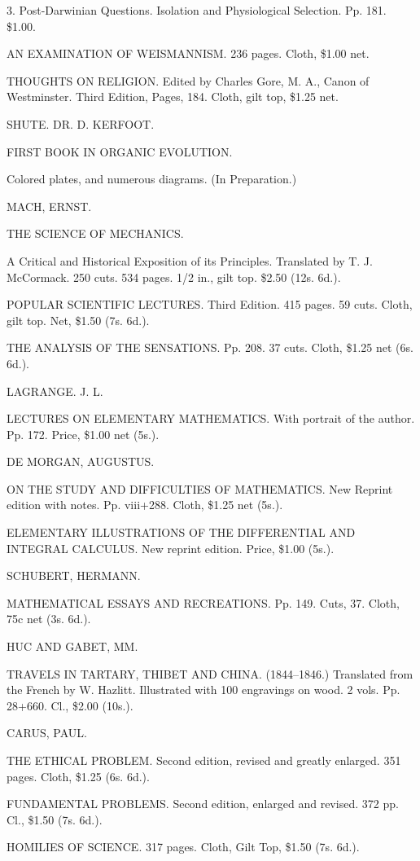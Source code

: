 \documentclass[12pt]{book}[2005/09/16]
\renewcommand{\(}{{\upshape(}}
\renewcommand{\)}{{\upshape)}}
\begin{document}
3. Post-Darwinian Questions. Isolation and Physiological Selection.
Pp. 181. \$1.00.

AN EXAMINATION OF WEISMANNISM.
236 pages. Cloth, \$1.00 net.

THOUGHTS ON RELIGION.
Edited by Charles Gore, M. A., Canon of Westminster. Third Edition,
Pages, 184. Cloth, gilt top, \$1.25 net.


SHUTE. DR. D. KERFOOT.

FIRST BOOK IN ORGANIC EVOLUTION.

Colored plates, and numerous diagrams. (In Preparation.)


MACH, ERNST.

THE SCIENCE OF MECHANICS.

A Critical and Historical Exposition of its Principles. Translated
by T. J. McCormack. 250 cuts. 534 pages. 1/2 in., gilt top. \$2.50 (12s. 6d.).

POPULAR SCIENTIFIC LECTURES.
Third Edition. 415 pages. 59 cuts. Cloth, gilt top. Net, \$1.50 (7s. 6d.).

THE ANALYSIS OF THE SENSATIONS.
Pp. 208. 37 cuts. Cloth, \$1.25 net (6s. 6d.).


LAGRANGE. J. L.

LECTURES ON ELEMENTARY MATHEMATICS.
With portrait of the author. Pp. 172. Price, \$1.00 net (5s.).


DE MORGAN, AUGUSTUS.

ON THE STUDY AND DIFFICULTIES OF MATHEMATICS.
New Reprint edition with notes. Pp. viii+288. Cloth, \$1.25 net (5s.).

ELEMENTARY ILLUSTRATIONS OF THE DIFFERENTIAL AND
INTEGRAL CALCULUS.
New reprint edition. Price, \$1.00 (5s.).


SCHUBERT, HERMANN.

MATHEMATICAL ESSAYS AND RECREATIONS.
Pp. 149. Cuts, 37. Cloth, 75c net (3s. 6d.).


HUC AND GABET, MM.

TRAVELS IN TARTARY, THIBET AND CHINA.
(1844--1846.) Translated from the French by W. Hazlitt. Illustrated
with 100 engravings on wood. 2 vols. Pp. 28+660. Cl., \$2.00 (10s.).

CARUS, PAUL.

THE ETHICAL PROBLEM.
Second edition, revised and greatly enlarged. 351 pages. Cloth, \$1.25
(6s. 6d.).

FUNDAMENTAL PROBLEMS.
Second edition, enlarged and revised. 372 pp. Cl., \$1.50 (7s. 6d.).

HOMILIES OF SCIENCE.
317 pages. Cloth, Gilt Top, \$1.50 (7s. 6d.).
\end{document}
